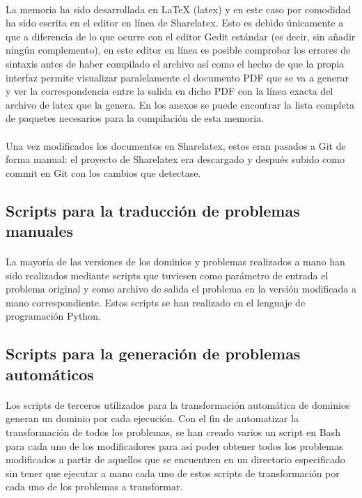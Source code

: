 \documentclass{article}
\begin{document}
\paragraph{}
La memoria ha sido desarrollada en \LaTeX{} (latex) y en este caso por comodidad ha sido escrita en el editor en línea de Sharelatex. Esto es debido únicamente a que a diferencia de lo que ocurre con el editor Gedit estándar (es decir, sin añadir ningún complemento), en este editor en línea es posible comprobar los errores de sintaxis antes de haber compilado el archivo así como el hecho de que la propia interfaz permite visualizar paralelamente el documento PDF que se va a generar y ver la correspondencia entre la salida en dicho PDF con la línea exacta del archivo de latex que la genera. En los anexos se puede encontrar la lista completa de paquetes necesarios para la compilación de esta memoria.

\paragraph{}
Una vez modificados los documentos en Sharelatex, estos eran pasados a Git de forma manual: el proyecto de Sharelatex era descargado y después subido como commit en Git con los cambios que detectase.

\subsection{Scripts para la traducción de problemas manuales}
\paragraph{}
La mayoría de las versiones de los dominios y problemas realizados a mano han sido realizados mediante scripts que tuviesen como parámetro de entrada el problema original y como archivo de salida el problema en la versión modificada a mano correspondiente. Estos scripts se han realizado en el lenguaje de programación Python.

\subsection{Scripts para la generación de problemas automáticos}
\paragraph{}
Los scripts de terceros utilizados para la transformación automática de dominios generan un dominio por cada ejecución. Con el fin de automatizar la transformación de todos los problemas, se han creado varios un script en Bash para cada uno de los modificadores para así poder obtener todos los problemas modificados a partir de aquellos que se encuentren en un directorio especificado sin tener que ejecutar a mano cada uno de estos scripts de transformación por cada uno de los problemas a transformar.
\end{document}
